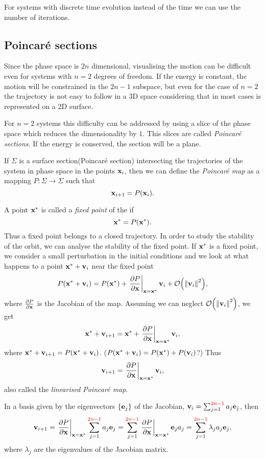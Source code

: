 \documentclass[../thesis.tex]{subfiles}
\theoremstyle{plain}
\begin{document}
For systems with discrete time evolution instead of the time we can use the number
of iterations.

\subsection{Poincaré sections}

Since the phase space is \(2n\) dimensional, visualising the motion can be
difficult even for systems with \(n=2\) degrees of freedom. If the energy is
constant, the motion will be constrained in the \(2n-1\) subspace, but even for
the case of \(n=2\) the trajectory is not easy to follow in a 3D space considering
that in most cases is represented on a 2D surface.

For \(n=2\) systems this difficulty can be addressed by using a slice of the phase
space which reduces the dimensionality by $1$. This slices are called
\emph{Poincaré sections}.
If the energy is conserved, the section will be a plane.

If \(\Sigma \) is a surface section{\color{red}(Poincaré section)} intersecting the
trajectories of the system in phase space in the points \(\vb{x}_i\), then we can
define the \emph{Poincaré map} as a mapping \({P:\Sigma \to \Sigma}\) such that
\[
  \vb{x}_{i+1} = P(\vb{x}_i).
\]

A point \(\vb{x}^*\) is called a \emph{fixed point} of the  if
\[
  \vb{x}^* = P(\vb{x}^*).
\]
Thus a fixed point belongs to a closed trajectory. In order to study the stability
of the orbit, we can analyse the stability of the fixed point.
If \(\vb{x}^*\) is a fixed point, we consider a small perturbation in the initial
conditions and we look at what happens to a point \(\vb{x}^* + \vb{v}_i\) near the fixed point
\[
  P(\vb{x}^* + \vb{v}_i) = P(\vb{x}^*) + \eval{\pdv{P}{\vb{x}}}_{\vb{x}=\vb{x}^*} \vb{v}_i + \order{\norm{\vb{v}_i}^2},
\]
where \(\pdv{P}{\vb{x}}\) is the Jacobian of the map.
Assuming we can neglect \(\order{\norm{\vb{v}_i}^2}\), we get
\[
  \vb{x}^* + \vb{v}_{i+1} = \vb{x}^* + \eval{\pdv{P}{\vb{x}}}_{\vb{x}=\vb{x}^*} \vb{v}_i,
\]
where \(\vb{x}^* + \vb{v}_{i+1} = P(\vb{x}^* + \vb{v}_i)\).{\color{red} (\(P(\vb{x}^* + \vb{v}_i) = P(\vb{x}^*) + P(\vb{v}_i)\)?)} Thus
\begin{equation}
  \label{eq:lin-map}
  \vb{v}_{i+1} = \eval{\pdv{P}{\vb{x}}}_{\vb{x}=\vb{x}^*} \vb{v}_i,
\end{equation}
{\color{red}also called the \emph{linearised Poincaré map}}.

In a basis given by the eigenvectors \( \{\vb{e}_j\} \) of the Jacobian,
\(\vb{v}_{i} = \sum_{j=1}^{{\color{red}2n-1}} a_j \vb{e}_j\), then
\[
  \vb{v}_{i+1} = \eval{\pdv{P}{\vb{x}}}_{\vb{x}=\vb{x}^*} \sum_{j=1}^{{\color{red}2n-1}} a_j \vb{e}_j
               = \sum_{j=1}^{{\color{red}2n-1}} \eval{\pdv{P}{\vb{x}}}_{\vb{x}=\vb{x}^*} \vb{e}_j a_j
               = \sum_{j=1}^{{\color{red}2n-1}} \lambda_j a_j \vb{e}_j,
\]
where \(\lambda_j\) are the eigenvalues of the Jacobian matrix.
\end{document}
